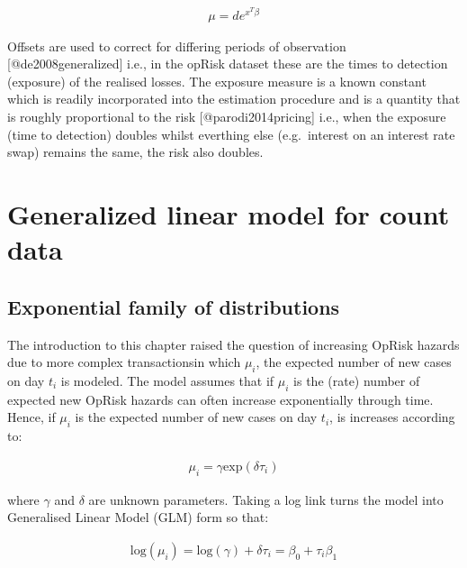 \documentclass[]{article}
\begin{document}
\singlespacing

\begin{eqnarray}
\mu = d e^{x^T\beta}
\end{eqnarray} \doublespacing

Offsets are used to correct for differing periods of observation
{[}@de2008generalized{]} i.e., in the opRisk dataset these are the times
to detection (exposure) of the realised losses. The exposure measure is
a known constant which is readily incorporated into the estimation
procedure and is a quantity that is roughly proportional to the risk
{[}@parodi2014pricing{]} i.e., when the exposure (time to detection)
doubles whilst everthing else (e.g.~interest on an interest rate swap)
remains the same, the risk also doubles.

\section{Generalized linear model for count data}
\label{sec:Generalized linear model for count data}

\subsection{Exponential family of distributions}

The introduction to this chapter raised the question of increasing
OpRisk hazards due to more complex transactionsin which \(\mu_i\), the
expected number of new cases on day \(t_i\) is modeled. The model
assumes that if \(\mu_i\) is the (rate) number of expected new OpRisk
hazards can often increase exponentially through time. Hence, if
\(\mu_i\) is the expected number of new cases on day \(t_i\), is
increases according to:

\singlespacing

\begin{eqnarray}\label{expgrowth}
\mu_i = \gamma \mbox{exp}({\delta\tau_i}) \nonumber
\end{eqnarray} \doublespacing

where \(\gamma\) and \(\delta\) are unknown parameters. Taking a log
link turns the model into Generalised Linear Model (GLM) form so that:

\singlespacing

\begin{eqnarray}\label{eqn:simplepoisson}
\mbox{log}(\mu_i) = \mbox{log}(\gamma) + \delta\tau_i = \beta_0 + \tau_i\beta_1
\end{eqnarray} \doublespacing
\end{document}

